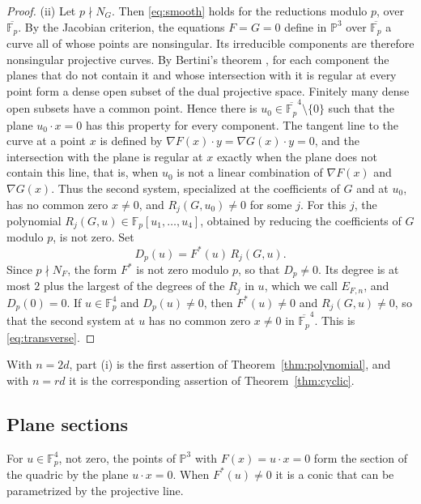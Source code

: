 \documentclass[11pt]{amsart}
\numberwithin{equation}{section}
\numberwithin{figure}{section}
\theoremstyle{definition}
\newcommand{\Fp}{\mathbb F_p}
\newcommand{\PP}{\mathbb P}
\begin{document}
\begin{proof}
(ii) Let $p\nmid N_G$. Then \eqref{eq:smooth} holds for the
reductions modulo $p$, over $\overline{\Fp}$. By the Jacobian
criterion, the equations $F=G=0$ define in $\PP^3$ over
$\overline{\Fp}$ a curve all of whose points are nonsingular. Its
irreducible components are therefore nonsingular projective curves.
By Bertini's theorem \cite[Chapter~II, Theorem~8.18]{Ha}, for each
component the planes that do not contain it and whose intersection
with it is regular at every point form a dense open subset of the
dual projective space. Finitely many dense open subsets have a
common point. Hence there is $u_0\in\overline{\Fp}^4\setminus\{0\}$
such that the plane $u_0\cdot x=0$ has this property for every
component. The tangent line to the curve at a point $x$ is defined by
$\nabla F(x)\cdot y=\nabla G(x)\cdot y=0$, and the intersection with
the plane is regular at $x$ exactly when the plane does not contain
this line, that is, when $u_0$ is not a linear combination of
$\nabla F(x)$ and $\nabla G(x)$. Thus the second system, specialized
at the coefficients of $G$ and at $u_0$, has no common zero
$x\ne0$, and $R_j(G,u_0)\ne0$ for some $j$. For this $j$, the
polynomial $R_j(G,u)\in\Fp[u_1,\ldots,u_4]$, obtained by reducing
the coefficients of $G$ modulo $p$, is not zero. Set
\[
 D_p(u)=F^*(u)\,R_j(G,u).
\]
Since $p\nmid N_F$, the form $F^*$ is not zero modulo $p$, so that
$D_p\ne0$. Its degree is at most $2$ plus the largest of the degrees
of the $R_j$ in $u$, which we call $E_{F,n}$, and $D_p(0)=0$. If
$u\in\Fp^4$ and $D_p(u)\ne0$, then $F^*(u)\ne0$ and $R_j(G,u)\ne0$,
so that the second system at $u$ has no common zero $x\ne0$ in
$\overline{\Fp}^4$. This is \eqref{eq:transverse}.
\end{proof}

With $n=2d$, part (i) is the first assertion of
Theorem~\ref{thm:polynomial}, and with $n=rd$ it is the corresponding
assertion of Theorem~\ref{thm:cyclic}.

\subsection{Plane sections}\label{sec:hyperplane}

For $u\in\Fp^4$, not zero, the points of $\PP^3$ with
$F(x)=u\cdot x=0$ form the section of the quadric by the plane
$u\cdot x=0$. When $F^*(u)\ne0$ it is a conic that can be
parametrized by the projective line.
\end{document}
